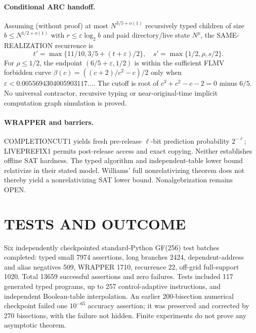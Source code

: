 \documentclass[11pt]{article}
\begin{document}
\paragraph{Conditional ARC handoff.}
Assuming (without proof) at most $N^{3/5+o(1)}$ recursively typed children of size $b\le N^{1/2+o(1)}$ with $r\le\varepsilon\log_2b$ and paid directory/live state $N^\rho$, the SAME-REALIZATION recurrence is
\[
t'=\max\{11/10,3/5+(t+\varepsilon)/2\},\quad
s'=\max\{1/2,\rho,s/2\}.
\]
For $\rho\le1/2$, the endpoint $(6/5+\varepsilon,1/2)$ is within the sufficient FLMV forbidden curve $\beta(c)=((c+2)/c^2-c)/2$ only when $\varepsilon<0.0055694304005903117\ldots$. The cutoff is root of $c^3+c^2-c-2=0$ minus $6/5$. No universal contractor, recursive typing or near-original-time implicit computation graph simulation is proved.
\paragraph{WRAPPER and barriers.}
COMPLETIONCUT1 yields fresh pre-release $\ell$-bit prediction probability $2^{-\ell}$; LIVEPREFIX1 permits post-release access and exact copying. Neither establishes offline SAT hardness. The typed algorithm and independent-table lower bound relativize in their stated model. Williams' full nonrelativizing theorem does not thereby yield a nonrelativizing SAT lower bound. Nonalgebrization remains OPEN.
\section{TESTS AND OUTCOME}
Six independently checkpointed standard-Python GF(256) test batches completed: typed small 7974 assertions, long branches 2424, dependent-address and alias negatives 509, WRAPPER 1710, recurrence 22, off-grid full-support 1020. Total 13659 successful assertions and zero failures. Tests included 117 generated typed programs, up to 257 control-adaptive instructions, and independent Boolean-table interpolation. An earlier 200-bisection numerical checkpoint failed one $10^{-65}$ accuracy assertion; it was preserved and corrected by 270 bisections, with the failure not hidden. Finite experiments do not prove any asymptotic theorem.
\end{document}
